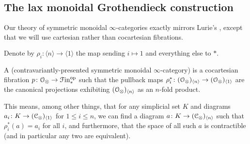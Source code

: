\documentclass[main.tex]{subfiles}
\begin{document}
\subsection{The lax monoidal Grothendieck construction}
\label{ssc:the_lax_monoidal_grothendieck_construction}

Our theory of symmetric monoidal $\infty$-categories exactly mirrors Lurie's \cite{luriehigheralgebra}, except that we will use cartesian rather than cocartesian fibrations.

\begin{notation}
  Denote by $\rho_{i}\colon \langle n \rangle \to \langle 1 \rangle$ the map sending $i \mapsto 1$ and everything else to $\ast$.
\end{notation}

\begin{definition}
  A  (contravariantly-presented symmetric monoidal $\infty$-category) is a cocartesian fibration $p\colon \mathcal{O}_{\otimes} \to \mathcal{F}\mathrm{in}_{*}^{\mathrm{op}}$ such that the pullback maps $\rho_{i}^{*}\colon (\mathcal{O}_{ \otimes})_{\langle n \rangle} \to (\mathcal{O}_{ \otimes})_{\langle 1 \rangle}$ are the canonical projections exhibiting $(\mathcal{O}_{ \otimes})_{\langle n \rangle}$ as an $n$-fold product.
\end{definition}

\begin{note}
  This means, among other things, that for any simplicial set $K$ and diagrams $a_{i}\colon K \to (\mathcal{C}_{\otimes})_{\langle 1 \rangle}$ for $1 \leq i \leq n$, we can find a diagram $a\colon K \to (\mathcal{C}_{\otimes})_{\langle n \rangle}$ such that $\rho_{i}^{*}(a) = a_{i}$ for all $i$, and furthermore, that the space of all such $a$ is contractible (and in particular any two are equivalent).
\end{note}
\end{document}
